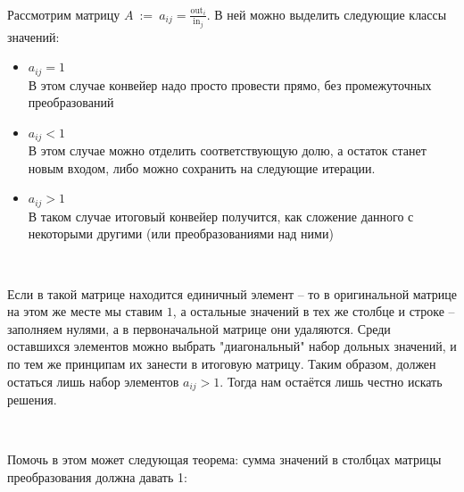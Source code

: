 \

Рассмотрим матрицу $A \ := \ a_{ij} = \frac{\text{out}_i}{\text{in}_j}$. В ней можно выделить следующие классы значений:



\begin{itemize}
	\item $a_{ij} = 1$ \\
		В этом случае конвейер надо просто провести прямо, без промежуточных преобразований
		
	\item $a_{ij} < 1$ \\
		В этом случае можно отделить соответствующую долю, а остаток станет новым входом, либо можно сохранить на следующие итерации.
	
	\item $a_{ij} > 1$ \\
		В таком случае итоговый конвейер получится, как сложение данного с некоторыми другими (или преобразованиями над ними)
\end{itemize}

\


Если в такой матрице находится единичный элемент -- то в оригинальной матрице на этом же месте мы ставим $1$, а остальные значений в тех же столбце и строке -- заполняем нулями, а в первоначальной матрице они удаляются. Среди оставшихся элементов можно выбрать "диагональный" набор дольных значений, и по тем же принципам их занести в итоговую матрицу. Таким образом, должен остаться лишь набор элементов $a_{ij} > 1$. Тогда нам остаётся лишь честно искать решения.

\

Помочь в этом может следующая теорема: сумма значений в столбцах матрицы преобразования должна давать 1:



